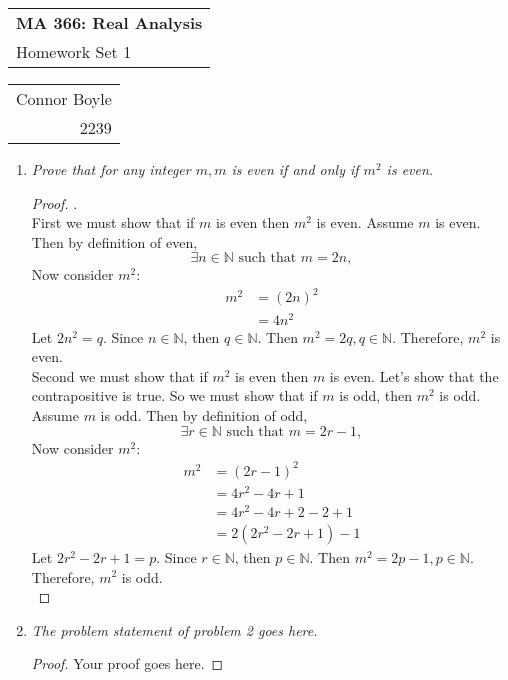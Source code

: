 \documentclass{amsart}
\def\name{Connor Boyle} %
\def\CM{2239} %
\def\hwnum{1} %
\begin{document}
\noindent
\thispagestyle{firststyle}
\begin{tabular}{l}
{\LARGE \textbf{MA 366: Real Analysis} }\\
{\Large Homework Set \hwnum}
\end{tabular} \hfill \begin{tabular}{r}
                        \name \\
                        \CM
                        \end{tabular}

\noindent \hrulefill

\begin{enumerate}[1.]
\item \emph{Prove that for any integer $m, m$ is even if and only if $m^2$ is even.}
\begin{proof} .\\

First we must show that if $m$ is even then $m^2$ is even.
Assume $m$ is even. Then by definition of even, 
\[\exists n\in\mathbb{N} \text{ such that } m = 2n, \]
Now consider $m^2$:
\begin{align*} 
    m^2 &= (2n)^2 \\
    &= 4n^2
\end{align*}
Let $2n^2 = q$. Since $n\in\mathbb{N}$, then $q\in\mathbb{N}$. 
Then $m^2 = 2q, q\in\mathbb{N}$. Therefore, $m^2$ is even. \\

Second we must show that if $m^2$ is even then $m$ is even.
Let's show that the contrapositive is true.
So we must show that if $m$ is odd, then $m^2$ is odd.
Assume $m$ is odd. Then by definition of odd, 
\[\exists r\in\mathbb{N} \text{ such that } m = 2r - 1, \]
Now consider $m^2$:
\begin{align*}
    m^2 &= (2r - 1)^2 \\
    &= 4r^2 - 4r + 1 \\
    &= 4r^2 - 4r + 2 - 2 + 1 \\
    &= 2(2r^2 -2r + 1) - 1
\end{align*}
Let $2r^2 - 2r + 1 = p$. Since $r\in\mathbb{N}$, then $p\in\mathbb{N}$.
Then $m^2 = 2p - 1, p\in\mathbb{N}$. Therefore, $m^2$ is odd. \\
\end{proof}

\newpage

\item \emph{The problem statement of problem 2 goes here.}
\begin{proof}
Your proof goes here.
\end{proof}

\end{enumerate}
\end{document}
